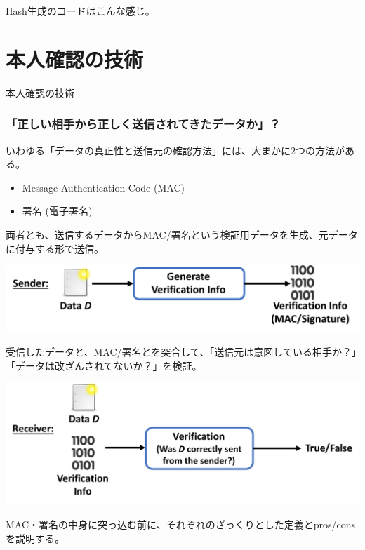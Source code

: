 \documentclass[12pt,dvipdfmx]{beamer}
\begin{document}
\begin{frame}
Hash生成のコードはこんな感じ。
\end{frame}
\section{本人確認の技術}
\begin{frame}
\centering
{\Large 本人確認の技術}
\end{frame}

\begin{frame}
\frametitle{「正しい相手から正しく送信されてきたデータか」？}
いわゆる「データの真正性と送信元の確認方法」には、大まかに2つの方法がある。
\begin{itemize}
 \item Message Authentication Code (MAC)
 \item 署名 (電子署名)
\end{itemize}

\end{frame}

\begin{frame}
両者とも、送信するデータからMAC/署名という検証用データを生成、元データに付与する形で送信。
\begin{center}
 \includegraphics[width=0.75\linewidth]{Figs/mac-sig-flow01.pdf}
\end{center}
受信したデータと、MAC/署名とを突合して、「送信元は意図している相手か？」「データは改ざんされてないか？」を検証。
\begin{center}
 \includegraphics[width=0.75\linewidth]{Figs/mac-sig-flow02.pdf}
\end{center}
\end{frame}

\begin{frame}
MAC・署名の中身に突っ込む前に、それぞれのざっくりとした定義とpros/consを説明する。
\end{frame}
\end{document}
